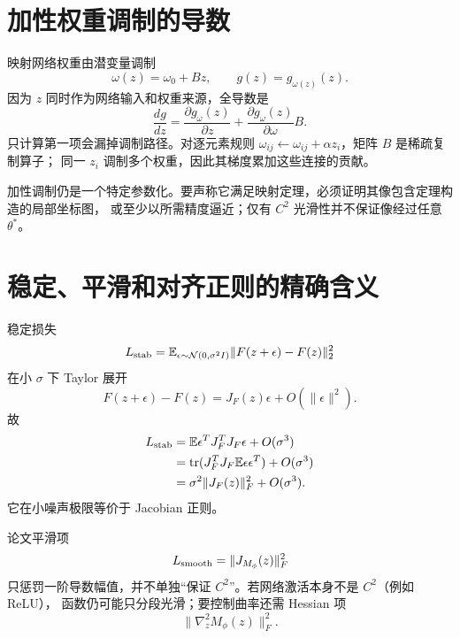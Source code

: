 \documentclass[11pt]{article}
\numberwithin{equation}{section}
\newcommand{\E}{\mathbb{E}}
\newcommand{\1}{\mathbf{1}}
\newcommand{\cN}{\mathcal{N}}
\newcommand{\tr}{\operatorname{tr}}
\begin{document}
\section{加性权重调制的导数}

映射网络权重由潜变量调制
\begin{equation}
 \omega(z)=\omega_0+Bz,\qquad
 g(z)=g_{\omega(z)}(z).
\end{equation}
因为 $z$ 同时作为网络输入和权重来源，全导数是
\begin{equation}
 \boxed{\frac{dg}{dz}
 =\frac{\partial g_\omega(z)}{\partial z}
 +\frac{\partial g_\omega(z)}{\partial\omega}B.}
\end{equation}
只计算第一项会漏掉调制路径。对逐元素规则
$\omega_{ij}\leftarrow\omega_{ij}+\alpha z_i$，矩阵 $B$ 是稀疏复制算子；
同一 $z_i$ 调制多个权重，因此其梯度累加这些连接的贡献。

加性调制仍是一个特定参数化。要声称它满足映射定理，必须证明其像包含定理构造的局部坐标图，
或至少以所需精度逼近；仅有 $C^2$ 光滑性并不保证像经过任意 $\theta^*$。

\section{稳定、平滑和对齐正则的精确含义}

稳定损失
\begin{equation}
 L_{\rm stab}=\E_{\epsilon\sim\cN(0,\sigma^2I)}
 \|F(z+\epsilon)-F(z)\|_2^2
\end{equation}
在小 $\sigma$ 下 Taylor 展开
\begin{equation}
 F(z+\epsilon)-F(z)=J_F(z)\epsilon+O(\|\epsilon\|^2).
\end{equation}
故
\begin{align}
 L_{\rm stab}
 &=\E\epsilon^TJ_F^TJ_F\epsilon+O(\sigma^3)\\
 &=\tr(J_F^TJ_F\E\epsilon\epsilon^T)+O(\sigma^3)\\
 &=\sigma^2\|J_F(z)\|_F^2+O(\sigma^3).
\end{align}
它在小噪声极限等价于 Jacobian 正则。

论文平滑项
\begin{equation}
 L_{\rm smooth}=\|J_{M_\phi}(z)\|_F^2
\end{equation}
只惩罚一阶导数幅值，并不单独“保证 $C^2$”。若网络激活本身不是 $C^2$（例如 ReLU），
函数仍可能只分段光滑；要控制曲率还需 Hessian 项
\begin{equation}
 \|\nabla_z^2M_\phi(z)\|_F^2.
\end{equation}
\end{document}

